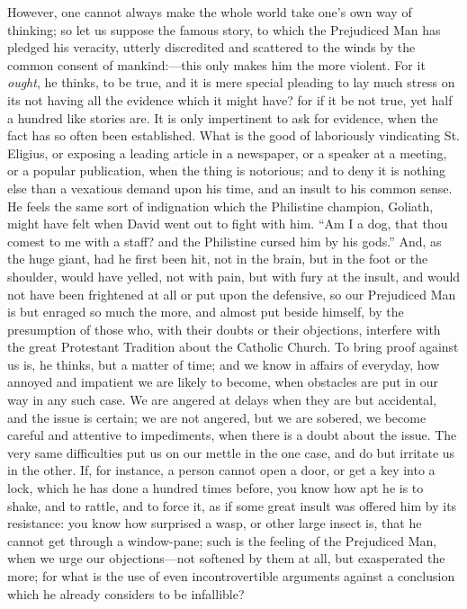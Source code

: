 However, one cannot always make the whole world take
one's own way of thinking; so let us suppose the famous
story, to which the Prejudiced Man has pledged his
veracity, utterly discredited and scattered to the winds
by the common consent of mankind:—this only makes
him the more violent. For it \emph{ought}, he thinks,
to be true, and it is mere special pleading to lay much
stress on its not having all the evidence which it might
have? for if it be not true, yet half a hundred like
stories are. It is only impertinent to ask for evidence,
when the fact has so often been established. What is the
good of laboriously vindicating St. Eligius, or exposing
a leading article in a newspaper, or a speaker at a
meeting, or a popular publication, when the thing is
notorious; and to deny it is nothing else than a
vexatious demand upon his time, and an insult to his
common sense. He feels the same sort of indignation which
the Philistine champion, Goliath, might have felt when
David went out to fight with him. ``Am I a dog, that
thou comest to me with a staff? and the Philistine cursed
him by his gods.'' And, as the huge giant, had he
first been hit, not in the brain, but in the foot or the
shoulder, would have yelled, not with pain, but with fury
at the insult, and would not have been frightened at all
or put upon the defensive, so our Prejudiced Man is but
enraged so much the more, and almost put beside himself,
by the presumption of those who, with their doubts or
their objections, interfere with the great Protestant
Tradition about the Catholic Church. To bring proof
against us is, he thinks, but a matter of time; and we
know in affairs of everyday, how annoyed and impatient we
are likely to become, when obstacles are put in our way
in any such case. We are angered at delays when they are but accidental, and the issue is certain; we are not
angered, but we are sobered, we become careful and
attentive to impediments, when there is a doubt about the
issue. The very same difficulties put us on our mettle in
the one case, and do but irritate us in the other. If,
for instance, a person cannot open a door, or get a key
into a lock, which he has done a hundred times before,
you know how apt he is to shake, and to rattle, and to
force it, as if some great insult was offered him by its
resistance: you know how surprised a wasp, or other large
insect is, that he cannot get through a window-pane; such
is the feeling of the Prejudiced Man, when we urge our
objections—not softened by them at all, but
exasperated the more; for what is the use of even
incontrovertible arguments against a conclusion which he
already considers to be infallible?

